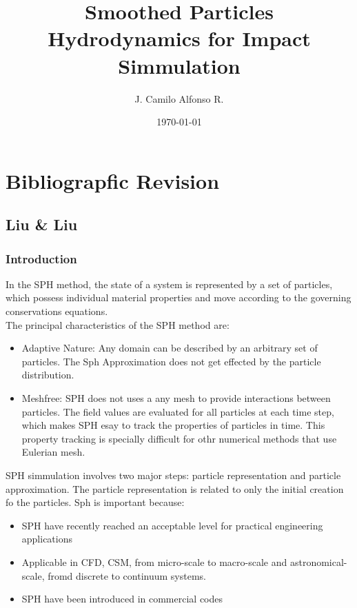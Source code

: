 \documentclass[12pt]{book}
\begin{document}
\title{Smoothed Particles Hydrodynamics for Impact Simmulation}
\author{J. Camilo Alfonso R.}
\date{\today}
\maketitle

\tableofcontents

\part{Bibliograpfic Revision}

\chapter{Liu \& Liu}

\section{Introduction}
In the SPH method, the state of a system is represented by a set of particles, which possess individual material properties and move according to the governing conservations equations.\\
The principal characteristics of the SPH method are:
\begin{itemize}
\item Adaptive Nature: Any domain can be described by an arbitrary set of particles. The Sph Approximation does not get effected by the particle distribution.
\item Meshfree: SPH does not uses a any mesh to provide interactions between particles. The field values are evaluated for all particles at each time step, which makes SPH esay to track the properties of particles in time. This property tracking is specially difficult for othr numerical methods that use Eulerian mesh.
\end{itemize} 
SPH simmulation involves two major steps: particle representation and particle approximation. The particle representation is related to only the initial creation fo the particles.
Sph is important because:
\begin{itemize}
\item SPH have recently reached an acceptable level for practical engineering applications
\item Applicable in CFD, CSM, from micro-scale to macro-scale and astronomical-scale, fromd discrete to continuum systems.
\item SPH have been introduced in commercial codes \cite{Liu_SPH}
\end{itemize}
\end{document}
